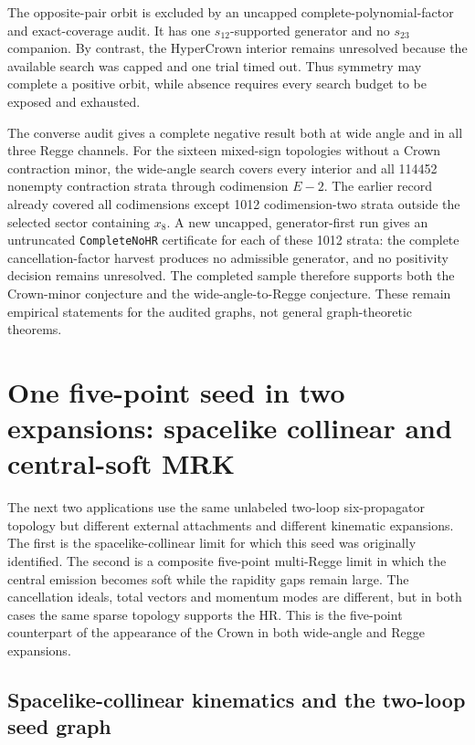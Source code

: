 \documentclass[a4paper,11pt]{article}
\begin{document}
The opposite-pair orbit is excluded by an uncapped complete-polynomial-factor
and exact-coverage audit.  It has one \(s_{12}\)-supported generator and no
\(s_{23}\) companion.  By contrast, the HyperCrown interior remains
unresolved because the available search was capped and one trial timed out.
Thus symmetry may complete a positive orbit, while absence requires every
search budget to be exposed and exhausted.

The converse audit gives a complete negative result both at wide angle and
in all three Regge channels.  For the sixteen mixed-sign topologies without a
Crown contraction minor, the wide-angle search covers every interior and all
114452 nonempty contraction strata through codimension \(E-2\).  The earlier
record already covered all codimensions except 1012 codimension-two strata
outside the selected sector containing \(x_8\).  A new uncapped,
generator-first run gives an untruncated \texttt{CompleteNoHR} certificate for
each of these 1012 strata: the complete cancellation-factor harvest produces
no admissible generator, and no positivity decision remains unresolved.  The
completed sample therefore supports both the Crown-minor conjecture and the
wide-angle-to-Regge conjecture.  These remain empirical statements for the
audited graphs, not general graph-theoretic theorems.

\section{One five-point seed in two expansions: spacelike collinear and central-soft MRK}
\label{sec:example-five-point}

The next two applications use the same unlabeled two-loop six-propagator
topology but different external attachments and different kinematic
expansions.  The first is the spacelike-collinear limit for which this seed
was originally identified.  The second is a composite five-point
multi-Regge limit in which the central emission becomes soft while the
rapidity gaps remain large.  The cancellation ideals, total vectors and
momentum modes are different, but in both cases the same sparse topology
supports the HR.  This is the five-point counterpart of the appearance of
the Crown in both wide-angle and Regge expansions.

\subsection{Spacelike-collinear kinematics and the two-loop seed graph}
\end{document}
